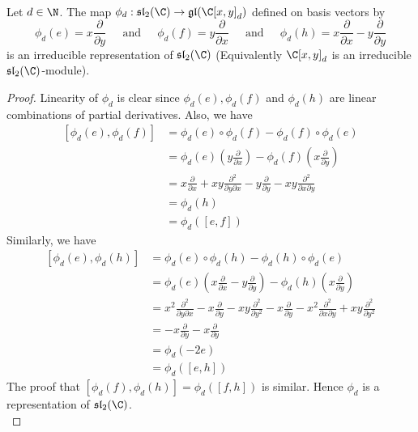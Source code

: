 \documentclass[a4paper]{article}
\begin{document}
\begin{prp}{}{} \\Let $d\in\N$. The map $\phi_d:\mathfrak{sl}_2(\C)\to\mathfrak{gl}(\C[x,y]_d)$ defined on basis vectors by $$\phi_d(e)=x\frac{\partial}{\partial y}\;\;\;\;\text{ and }\;\;\;\;\phi_d(f)=y\frac{\partial}{\partial x}\;\;\;\;\text{ and }\;\;\;\;\phi_d(h)=x\frac{\partial}{\partial x}-y\frac{\partial}{\partial y}$$ is an irreducible representation of $\mathfrak{sl}_2(\C)$ (Equivalently $\C[x,y]_d$ is an irreducible $\mathfrak{sl}_2(\C)$-module). 
\begin{proof}
Linearity of $\phi_d$ is clear since $\phi_d(e),\phi_d(f)$ and $\phi_d(h)$ are linear combinations of partial derivatives. Also, we have 
\begin{align*}
\left[\phi_d(e),\phi_d(f)\right]&=\phi_d(e)\circ\phi_d(f)-\phi_d(f)\circ\phi_d(e)\\
&=\phi_d(e)\left(y\frac{\partial}{\partial x}\right)-\phi_d(f)\left(x\frac{\partial}{\partial y}\right)\\
&=x\frac{\partial}{\partial x}+xy\frac{\partial^2}{\partial y\partial x}-y\frac{\partial}{\partial y}-xy\frac{\partial^2}{\partial x\partial y}\\
&=\phi_d(h)\\
&=\phi_d([e,f])
\end{align*}
Similarly, we have 
\begin{align*}
\left[\phi_d(e),\phi_d(h)\right]&=\phi_d(e)\circ\phi_d(h)-\phi_d(h)\circ\phi_d(e)\\
&=\phi_d(e)\left(x\frac{\partial}{\partial x}-y\frac{\partial}{\partial y}\right)-\phi_d(h)\left(x\frac{\partial}{\partial y}\right)\\
&=x^2\frac{\partial^2}{\partial y\partial x}-x\frac{\partial}{\partial y}-xy\frac{\partial^2}{\partial y^2}-x\frac{\partial}{\partial y}-x^2\frac{\partial^2}{\partial x\partial y}+xy\frac{\partial^2}{\partial y^2}\\
&=-x\frac{\partial}{\partial y}-x\frac{\partial}{\partial y}\\
&=\phi_d(-2e)\\
&=\phi_d([e,h])
\end{align*}
The proof that $\left[\phi_d(f),\phi_d(h)\right]=\phi_d([f,h])$ is similar. Hence $\phi_d$ is a representation of $\mathfrak{sl}_2(\C)$. \\


\end{proof}
\end{prp}
\end{document}
